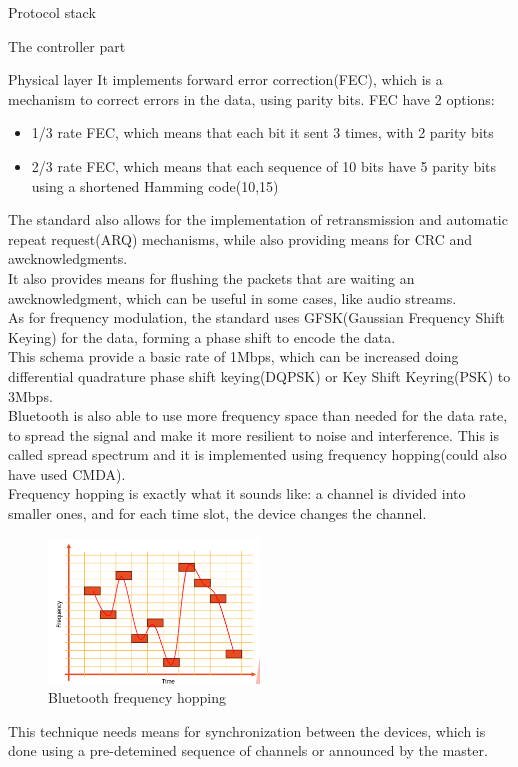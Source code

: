 \begin{section}{Protocol stack}
\begin{subsection}{The controller part}
\begin{subsubsection}{Physical layer}
      It implements forward error correction(FEC), which is a mechanism to correct errors in the
      data, using parity bits. FEC have 2 options: 
      \begin{itemize}
        \item 1/3 rate FEC, which means that each bit it sent 3 times, with 2 parity bits
        \item 2/3 rate FEC, which means that each sequence of 10 bits have 5 parity bits
          using a shortened Hamming code(10,15)
      \end{itemize}
      The standard also allows for the implementation of retransmission
      and automatic repeat request(ARQ) mechanisms, while also providing means for CRC and
      awcknowledgments.\\
      It also provides means for flushing the packets that are waiting an awcknowledgment, which
      can be useful in some cases, like audio streams.\\

      As for frequency modulation, the standard uses GFSK(Gaussian Frequency Shift Keying) for the
      data, forming a phase shift to encode the data.\\
      This schema provide a basic rate of 1Mbps, which can be increased doing differential quadrature
      phase shift keying(DQPSK) or Key Shift Keyring(PSK) to 3Mbps.\\

      Bluetooth is also able to use more frequency space than needed for the data rate, to spread the
      signal and make it more resilient to noise and interference. This is called spread spectrum
      and it is implemented using frequency hopping(could also have used CMDA).\\
      Frequency hopping is exactly what it sounds like: a channel is divided into smaller ones, and 
      for each time slot, the device changes the channel. 

      \begin{figure}[H]
        \centering
        \includegraphics[width=0.5\textwidth]{img/wireless/frequency hopping.png}
        \caption{Bluetooth frequency hopping}
      \end{figure}
    This technique needs means for synchronization between the devices, which is done using a
    pre-detemined sequence of channels or announced by the master.\\


\end{subsubsection}
\end{subsection}
\end{section}
